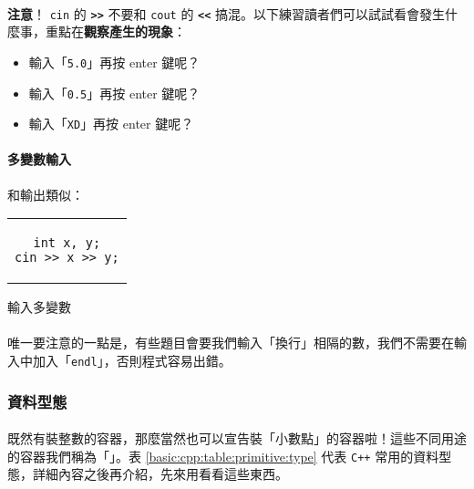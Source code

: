 \documentclass[12pt,a4paper,oneside]{article}
\begin{document}
\begin{CJK}{UTF8}{bkai}
\paragraph{}\textbf{注意}！ \lstinline!cin! 的 \textbf{\lstinline!>>!} 不要和 \lstinline!cout! 的 \textbf{\lstinline!<<!} 搞混。以下練習讀者們可以試試看會發生什麼事，重點在\textbf{觀察產生的現象}：

\begin{itemize}
\item 輸入「\texttt{5.0}」再按 enter 鍵呢？
\item 輸入「\texttt{0.5}」再按 enter 鍵呢？
\item 輸入「\texttt{XD}」再按 enter 鍵呢？
\end{itemize}

\paragraph{多變數輸入}和輸出類似：

\begin{code}[h!]
\centering
\begin{tabular}{c}
\begin{lstlisting}
int x, y;
cin >> x >> y;
\end{lstlisting}
\end{tabular}
\caption{輸入多變數}
\label{basic:cpp:code:cin:variables}
\end{code}

\paragraph{}唯一要注意的一點是，有些題目會要我們輸入「換行」相隔的數，我們不需要在輸入中加入「\lstinline!endl!」，否則程式容易出錯。

\subsubsection{資料型態}

\paragraph{}既然有裝整數的容器，那麼當然也可以宣告裝「小數點」的容器啦！這些不同用途的容器我們稱為「」。表 \ref{basic:cpp:table:primitive:type} 代表 \texttt{C++} 常用的資料型態，詳細內容之後再介紹，先來用看看這些東西。


\end{CJK}
\end{document}
